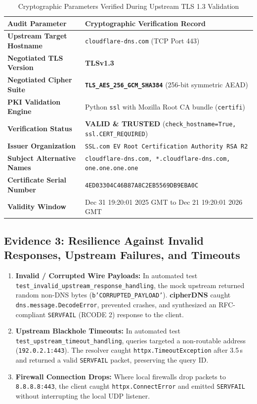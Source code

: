 \documentclass[10pt,a4paper]{article}
\begin{document}
\begin{table}[H]
\centering
\small
\caption{Cryptographic Parameters Verified During Upstream TLS 1.3 Validation}
\label{tab:cert_validation}
\begin{tabularx}{\textwidth}{l X}
\toprule
\textbf{Audit Parameter} & \textbf{Cryptographic Verification Record} \\
\midrule
\textbf{Upstream Target Hostname} & \texttt{cloudflare-dns.com} (TCP Port 443) \\
\textbf{Negotiated TLS Version} & \textbf{TLSv1.3} \\
\textbf{Negotiated Cipher Suite} & \textbf{\texttt{TLS\_AES\_256\_GCM\_SHA384}} (256-bit symmetric AEAD) \\
\textbf{PKI Validation Engine} & Python \texttt{ssl} with Mozilla Root CA bundle (\texttt{certifi}) \\
\textbf{Verification Status} & \textcolor{emeraldpass}{\textbf{VALID \& TRUSTED}} (\texttt{check\_hostname=True, ssl.CERT\_REQUIRED}) \\
\textbf{Issuer Organization} & \texttt{SSL.com EV Root Certification Authority RSA R2} \\
\textbf{Subject Alternative Names} & \texttt{cloudflare-dns.com, *.cloudflare-dns.com, one.one.one.one} \\
\textbf{Certificate Serial Number} & \texttt{4ED03304C46B87A8C2EB5569DB9EBA0C} \\
\textbf{Validity Window} & Dec 31 19:20:01 2025 GMT to Dec 21 19:20:01 2026 GMT \\
\bottomrule
\end{tabularx}
\end{table}

\subsection{Evidence 3: Resilience Against Invalid Responses, Upstream Failures, and Timeouts}
\begin{enumerate}\itemsep 2pt
    \item \textbf{Invalid / Corrupted Wire Payloads:} In automated test \texttt{test\_invalid\_upstream\_response\_handling}, the mock upstream returned random non-DNS bytes (\texttt{b'CORRUPTED\_PAYLOAD'}). \textbf{cipherDNS} caught \texttt{dns.message.DecodeError}, prevented crashes, and synthesized an RFC-compliant \texttt{SERVFAIL} (RCODE 2) response to the client.
    \item \textbf{Upstream Blackhole Timeouts:} In automated test \texttt{test\_upstream\_timeout\_handling}, queries targeted a non-routable address (\texttt{192.0.2.1:443}). The resolver caught \texttt{httpx.TimeoutException} after 3.5\,s and returned a valid \texttt{SERVFAIL} packet, preserving the query ID.
    \item \textbf{Firewall Connection Drops:} Where local firewalls drop packets to \texttt{8.8.8.8:443}, the client caught \texttt{httpx.ConnectError} and emitted \texttt{SERVFAIL} without interrupting the local UDP listener.
\end{enumerate}
\end{document}
